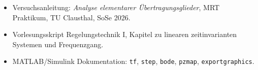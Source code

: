 \begin{itemize}
  \item Versuchsanleitung: \textit{Analyse elementarer Übertragungsglieder}, MRT Praktikum, TU Clausthal, SoSe 2026.
  \item Vorlesungsskript Regelungstechnik I, Kapitel zu linearen zeitinvarianten Systemen und Frequenzgang.
  \item MATLAB/Simulink Dokumentation: \texttt{tf}, \texttt{step}, \texttt{bode}, \texttt{pzmap}, \texttt{exportgraphics}.
\end{itemize}
